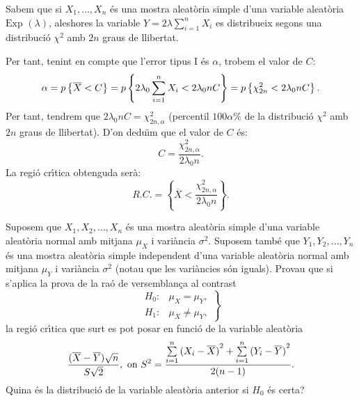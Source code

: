 {Sabem que si $X_1,\ldots,X_n$ \'es una mostra aleat\`oria simple d'una
variable aleat\`oria $\mbox{Exp }(\lambda)$, aleshores la variable
\mbox{$Y=2\lambda\sum\limits_{i=1}^n X_i$} es distribueix
segons una distribuci\'o $\chi^2$ amb $2n$ graus de llibertat.

Per tant, tenint en compte que l'error tipus I \'es $\alpha$, trobem
el valor de $C$:
\[
\alpha =p\left\{\overline{X}<C\right\}=p\left\{2\lambda_0 \sum_{i=1}^n
X_i < 2\lambda_0 n C\right\}=p\left\{\chi_{2n}^2 < 2\lambda_0 n C\right\}.
\]
Per tant, tendrem que $2\lambda_0 n C=\chi_{2n,\alpha}^2$ (percentil
$100\alpha\%$ de la distribuci\'o $\chi^2$ amb $2n$ graus de llibertat).
D'on dedu\"{\i}m que el valor de $C$ \'es:
\[
C=\frac{\chi_{2n,\alpha}^2}{2\lambda_0 n}.
\]
La regi\'o cr\'{\i}tica obtenguda ser\`a:
\[
R.C.=\left\{\overline{X}<\frac{\chi_{2n,\alpha}^2}{2\lambda_0 n}\right\}.
\]
}

\begin{probres}
{Suposem que $X_1,X_2,\ldots,X_n$ \'es una mostra aleat\`oria 
simple d'una variable aleat\`oria normal amb
mitjana $\mu_X$ i vari\`ancia $\sigma^2$. 
Suposem tamb\'e que $Y_1,Y_2,\ldots,Y_n$ \'es
una mostra aleat\`oria simple independent d'una variable aleat\`oria normal amb mitjana $\mu_Y$ i vari\`ancia $\sigma^2$
(notau que les vari\`ancies s\'on iguals). Provau que si s'aplica la prova de la ra\'o
de versemblan\c{c}a al contrast
$$\left.
\begin{array}{ll}
H_0 :& \mu_X=\mu_Y,\\ H_1:& \mu_X\not
=\mu_Y,
\end{array}
\right\}$$
la regi\'o cr\'{\i}tica que surt es pot posar en funci\'o 
de la variable aleat\`oria 
$${(\overline{X}-\overline{Y})\sqrt{n}\over S\sqrt{2}},\mbox{ on
}S^2={\sum\limits_{i=1}^n {(X_i-\overline{X})}^2 +  \sum\limits_{i=1}^n
{(Y_i-\overline{Y})}^2\over 2(n-1)}.$$
Quina \'es la distribuci\'o de la variable aleat\`oria anterior
si $H_0$ \'es certa?}
\end{probres}

